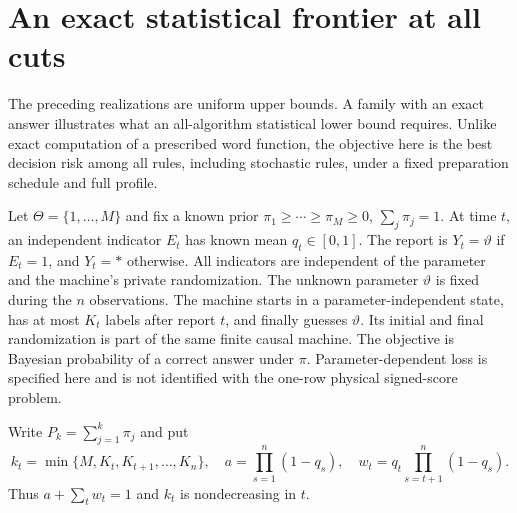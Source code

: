 \section{An exact statistical frontier at all cuts}
\label{sec:v22-revelation}
The preceding realizations are uniform upper bounds. A family with an
exact answer illustrates what an all-algorithm statistical lower bound
requires. Unlike exact computation of a prescribed word function, the
objective here is the best decision risk among all rules, including
stochastic rules, under a fixed preparation schedule and full profile.

Let $\Theta=\{1,\ldots,M\}$ and fix a known prior
$\pi_1\ge\cdots\ge\pi_M\ge0$, $\sum_j\pi_j=1$. At time $t$, an
independent indicator $E_t$ has known mean $q_t\in[0,1]$. The report is
$Y_t=\vartheta$ if $E_t=1$, and $Y_t=*$ otherwise. All indicators are
independent of the parameter and the machine's private randomization.
The unknown parameter $\vartheta$ is fixed during the $n$ observations.
The machine starts in a parameter-independent state, has at most $K_t$
labels after report $t$, and finally guesses $\vartheta$. Its initial
and final randomization is part of the same finite causal machine.
The objective is Bayesian probability of a correct answer under $\pi$.
Parameter-dependent loss is specified here and is not identified with
the one-row physical signed-score problem.

Write $P_k=\sum_{j=1}^k\pi_j$ and put
\begin{equation}\label{eq:v22-revelation-weights}
 k_t=\min\{M,K_t,K_{t+1},\ldots,K_n\},\quad
 a=\prod_{s=1}^n(1-q_s),\quad
 w_t=q_t\prod_{s=t+1}^n(1-q_s).
\end{equation}
Thus $a+\sum_t w_t=1$ and $k_t$ is nondecreasing in $t$.

